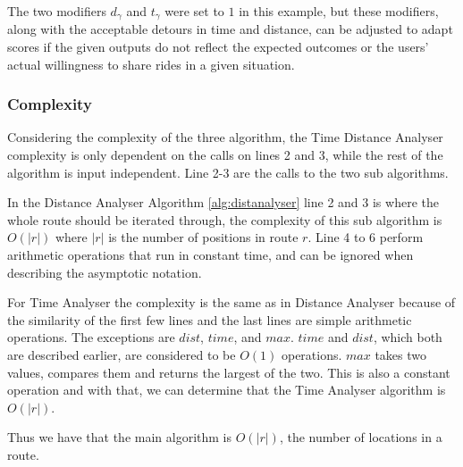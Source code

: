The two modifiers $d_\gamma$ and $t_\gamma$ were set to $1$ in this example, but these modifiers, along with the acceptable detours in time and distance, can be adjusted to adapt scores if the given outputs do not reflect the expected outcomes or the users' actual willingness to share rides in a given situation. 

\subsubsection{Complexity}
Considering the complexity of the three algorithm, the Time Distance Analyser complexity is only dependent on the calls on lines 2 and 3, while the rest of the algorithm is input independent.
Line 2-3 are the calls to the two sub algorithms.

In the Distance Analyser Algorithm \ref{alg:distanalyser} line 2 and 3 is where the whole route should be iterated through, the complexity of this sub algorithm is $O(|r|)$ where $|r|$ is the number of positions in route $r$.
Line 4 to 6 perform arithmetic operations that run in constant time, and can be ignored when describing the asymptotic notation.

For Time Analyser the complexity is the same as in Distance Analyser because of the similarity of the first few lines and the last lines are simple arithmetic operations. 
The exceptions are $dist$, $time$, and $max$. 
$time$ and $dist$, which both are described earlier, are considered to be $O(1)$ operations.
$max$ takes two values, compares them and returns the largest of the two.
This is also a constant operation and with that, we can determine that the Time Analyser algorithm is $O(|r|)$.

Thus we have that the main algorithm is $O(|r|)$, the number of locations in a route.